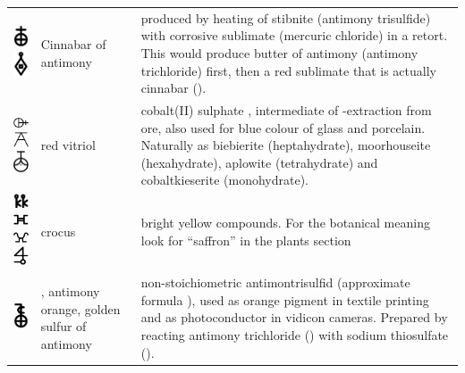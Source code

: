 \documentclass[british,final,landscape]{scrartcl}
\begin{document}
\begin{refsection}
\begin{supertabular}{p{0.3\textwidth}p{0.34\textwidth}p{0.34\textwidth}}
   \includegraphics[width=5mm]{Compounds/CinnabarOfAntimony} \includegraphics[width=5mm]{Compounds/CinnabarOfAntimony2} & Cinnabar of antimony & produced by heating of stibnite (antimony trisulfide) with corrosive sublimate (mercuric chloride) in a retort. This would produce butter of antimony (antimony trichloride) first, then a red sublimate that is actually cinnabar (). \\
   \includegraphics[width=5mm]{Compounds/CoSO4}  \includegraphics[width=5mm]{Compounds/CoSO4-2}  \includegraphics[width=5mm]{Compounds/CoSO4-3}  & red vitriol & cobalt(II) sulphate , intermediate of -extraction from ore, also used for blue colour of glass and porcelain. Naturally as biebierite (heptahydrate), moorhouseite (hexahydrate), aplowite (tetrahydrate) and cobaltkieserite (monohydrate).  \\
   \includegraphics[width=5mm]{Mixtures/Crocus} \includegraphics[width=5mm]{Mixtures/Crocus2} \includegraphics[width=5mm]{Mixtures/Crocus3} \includegraphics[width=5mm]{Mixtures/Crocus4} & crocus & bright yellow compounds. For the botanical meaning look for ``saffron'' in the plants section \label{text:saffron}\\
   \includegraphics[width=5mm]{Compounds/CrocusAntimonii} & , antimony orange, golden sulfur of antimony  & non-stoichiometric antimontrisulfid (approximate formula ), used as orange pigment in textile printing and as photoconductor in vidicon cameras. Prepared by reacting antimony trichloride () with sodium thiosulfate ().  \\

\end{supertabular}
\end{refsection}
\end{document}
